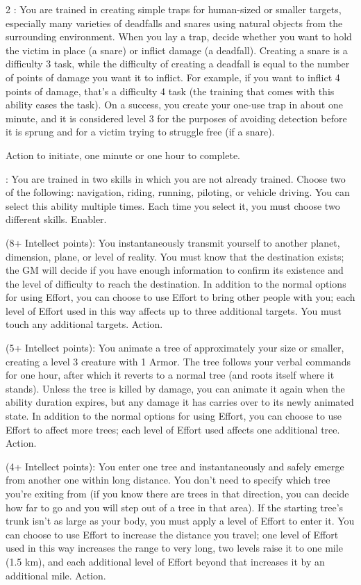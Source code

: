 \begin{multicols}{2}
: You are trained in creating simple traps for human-sized or smaller targets, especially many varieties of deadfalls and snares using natural objects from the surrounding environment. When you lay a trap, decide whether you want to hold the victim in place (a snare) or inflict damage (a deadfall). Creating a snare is a difficulty 3 task, while the difficulty of creating a deadfall is equal to the number of points of damage you want it to inflict. For example, if you want to inflict 4 points of damage, that’s a difficulty 4 task (the training that comes with this ability eases the task). 
On a success, you create your one-use trap in about one minute, and it is considered level 3 for the purposes of avoiding detection before it is sprung and for a victim trying to struggle free (if a snare). 

Action to initiate, one minute or one hour to complete. 
 
: You are trained in two skills in which you are not already trained. Choose two of the following: navigation, riding, running, piloting, or vehicle driving. You can select this ability multiple times. Each time you select it, you must choose two different skills. Enabler. 
 
 (8+ Intellect points): You instantaneously transmit yourself to another planet, dimension, plane, or level of reality. You must know that the destination exists; the GM will decide if you have enough information to confirm its existence and the level of difficulty to reach the destination. In addition to the normal options for using Effort, you can choose to use Effort to bring other people with you; each level of Effort used in this way affects up to three additional targets. You must touch any additional targets. Action. 
 
 (5+ Intellect points): You animate a tree of approximately your size or smaller, creating a level 3 creature with 1 Armor. The tree follows your verbal commands for one hour, after which it reverts to a normal tree (and roots itself where it stands). Unless the tree is killed by damage, you can animate it again when the ability duration expires, but any damage it has carries over to its newly animated state. In addition to the normal options for using Effort, you can choose to use Effort to affect more trees; each level of Effort used affects one additional tree. Action.

 (4+ Intellect points): You enter one tree and instantaneously and safely emerge from another one within long distance. You don’t need to specify which tree you’re exiting from (if you know there are trees in that direction, you can decide how far to go and you will step out of a tree in that area). If the starting tree’s trunk isn’t as large as your body, you must apply a level of Effort to enter it. You can choose to use Effort to increase the distance you travel; one level of Effort used in this way increases the range to very long, two levels raise it to one mile (1.5 km), and each additional level of Effort beyond that increases it by an additional mile. Action.


\end{multicols}
